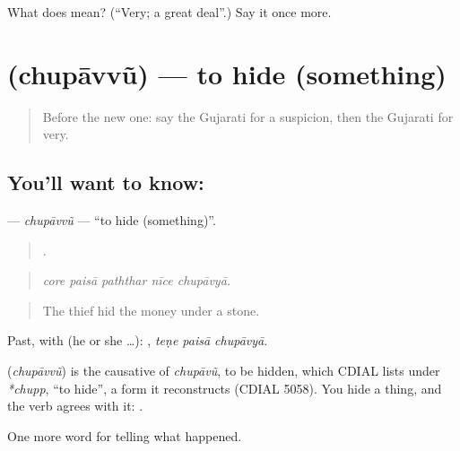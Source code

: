 \begin{tcolorbox}[breakable,colback=teal!4,colframe=teal!35!black,title={Before you move on}]
What does  mean? (\textquotedblleft{}Very; a great deal\textquotedblright{}.) Say it once more.
\end{tcolorbox}
\section[\texorpdfstring{\gu{છુપાવવું} (chupāvvũ)}{છુપાવવું (chupāvvũ)}]{ (chupāvvũ) — to hide (something)}

\label{lesson:GU-C286-chupavvu}



\begin{quote}
Before the new one: say the Gujarati for a suspicion, then the Gujarati for very.
\end{quote}

\subsection*{You'll want to know: }
\textbf{} — \emph{chupāvvũ} — \textquotedblleft{}to hide (something)\textquotedblright{}.

\begin{quote}
    .
\end{quote}

\begin{quote}
\emph{core paisā paththar nīce chupāvyā.}
\end{quote}

\begin{quote}
The thief hid the money under a stone.
\end{quote}

Past, with  (he or she …):   , \emph{teṇe paisā chupāvyā}.

\begin{cousinweb}
\textbf{} (\emph{chupāvvũ}) is the causative of \emph{chupāvũ}, to be hidden, which CDIAL lists under \emph{*chupp}, \textquotedblleft{}to hide\textquotedblright{}, a form it reconstructs (CDIAL 5058). You hide a thing, and the verb agrees with it: \textbf{ }.
\end{cousinweb}

\begin{grammarlens}[title={What you've built}]
One more word for telling what happened.
\end{grammarlens}

